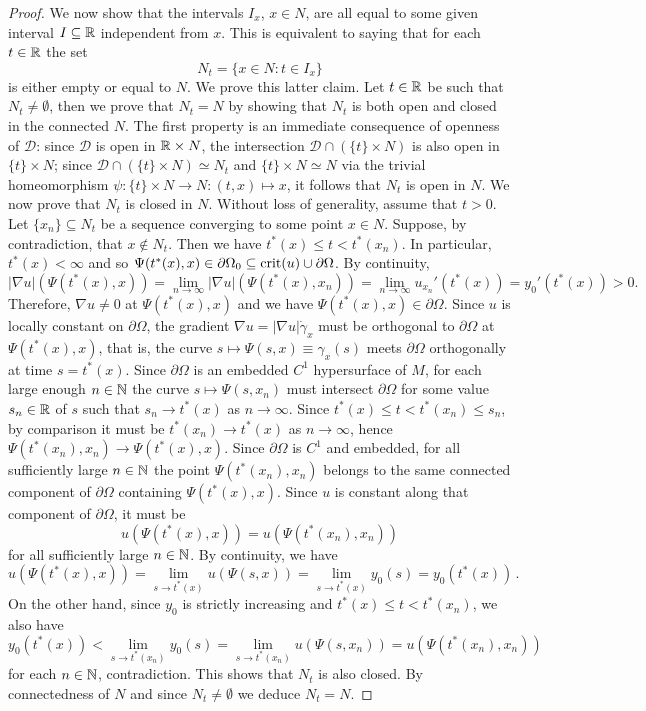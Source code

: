 \documentclass[10 pt,a4paper]{article}
\theoremstyle{definition}
\begin{document}
\begin{proof}
	We now show that the intervals $I_x$, $x\in N$, are all equal to some given interval $I\subseteq\mathbb R$ independent from $x$. This is equivalent to saying that for each $t\in\mathbb R$ the set
	\[
		N_t = \{ x \in N : t \in I_x \}
	\]
	is either empty or equal to $N$. We prove this latter claim. Let $t\in\mathbb R$ be such that $N_t\neq\emptyset$, then we prove that $N_t = N$ by showing that $N_t$ is both open and closed in the connected $N$. The first property is an immediate consequence of openness of $\mathscr D$: since $\mathscr D$ is open in $\mathbb R\times N$, the intersection $\mathscr D \cap (\{t\}\times N)$ is also open in $\{t\}\times N$; since $\mathscr D \cap (\{t\}\times N) \simeq N_t$ and $\{t\}\times N \simeq N$ via the trivial homeomorphism $\psi : \{t\}\times N \to N : (t,x) \mapsto x$, it follows that $N_t$ is open in $N$. We now prove that $N_t$ is closed in $N$. Without loss of generality, assume that $t>0$. Let $\{x_n\} \subseteq N_t$ be a sequence converging to some point $x\in N$. Suppose, by contradiction, that $x\not\in N_t$. Then we have $t^\ast(x) \leq t < t^\ast(x_n)$. In particular, $t^\ast(x) < \infty$ and so $\Psi(t^\ast(x),x) \in \partial\Omega_0 \subseteq {\rm crit}(u)\cup\partial\Omega$. By continuity,
	\[
		|\nabla u|(\Psi(t^\ast(x),x)) = \lim_{n\to\infty} |\nabla u|(\Psi(t^\ast(x),x_n)) = \lim_{n\to\infty} u_{x_n}'(t^\ast(x)) = y_0'(t^\ast(x)) > 0.
	\]
	Therefore, $\nabla u\neq 0$ at $\Psi(t^\ast(x),x)$ and we have $\Psi(t^\ast(x),x) \in \partial\Omega$. Since $u$ is locally constant on $\partial\Omega$, the gradient $\nabla u = |\nabla u|\dot\gamma_x$ must be orthogonal to $\partial\Omega$ at $\Psi(t^\ast(x),x)$, that is, the curve $s \mapsto \Psi(s,x) \equiv \gamma_x(s)$ meets $\partial\Omega$ orthogonally at time $s = t^\ast(x)$. Since $\partial\Omega$ is an embedded $C^1$ hypersurface of $M$, for each large enough $n\in\mathbb N$ the curve $s \mapsto \Psi(s,x_n)$ must intersect $\partial\Omega$ for some value $s_n\in\mathbb R$ of $s$ such that $s_n \to t^\ast(x)$ as $n\to\infty$. Since $t^\ast(x) \leq t < t^\ast(x_n) \leq s_n$, by comparison it must be $t^\ast(x_n) \to t^\ast(x)$ as $n\to\infty$, hence $\Psi(t^\ast(x_n),x_n) \to \Psi(t^\ast(x),x)$. Since $\partial\Omega$ is $C^1$ and embedded, for all sufficiently large $n\in\mathbb N$ the point $\Psi(t^\ast(x_n),x_n)$ belongs to the same connected component of $\partial\Omega$ containing $\Psi(t^\ast(x),x)$. Since $u$ is constant along that component of $\partial\Omega$, it must be
	\[
		u(\Psi(t^\ast(x),x)) = u(\Psi(t^\ast(x_n),x_n))
	\]
	for all sufficiently large $n\in\mathbb N$. By continuity, we have
	\[
		u(\Psi(t^\ast(x),x)) = \lim_{s\to t^\ast(x)} u(\Psi(s,x)) = \lim_{s\to t^\ast(x)} y_0(s) = y_0(t^\ast(x)) \, .
	\]
	On the other hand, since $y_0$ is strictly increasing and $t^\ast(x) \leq t < t^\ast(x_n)$, we also have
	\[
		y_0(t^\ast(x)) < \lim_{s\to t^\ast(x_n)} y_0(s) = \lim_{s\to t^\ast(x_n)} u(\Psi(s,x_n)) = u(\Psi(t^\ast(x_n),x_n))
	\]
	for each $n\in\mathbb N$, contradiction. This shows that $N_t$ is also closed. By connectedness of $N$ and since $N_t\neq\emptyset$ we deduce $N_t=N$.
	

\end{proof}
\end{document}
